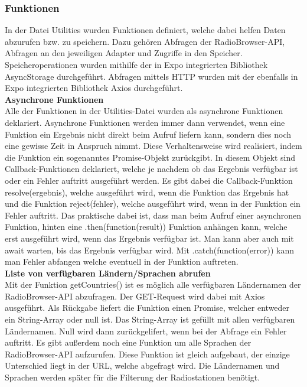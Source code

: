\documentclass[11pt, twoside]{article}
\begin{document}
\subsubsection{Funktionen}
In der Datei Utilities wurden Funktionen definiert, welche dabei helfen Daten abzurufen bzw. zu speichern. Dazu gehören Abfragen der RadioBrowser-API, Abfragen an den jeweiligen Adapter und Zugriffe in den Speicher. Speicheroperationen wurden mithilfe der in Expo integrierten Bibliothek \glqq AsyncStorage \grqq{}  durchgeführt. Abfragen mittels HTTP wurden mit der ebenfalls in Expo integrierten Bibliothek \glqq Axios \grqq{} durchgeführt. \newline \\
\textbf{Asynchrone Funktionen} \\
Alle der Funktionen in der Utilities-Datei wurden als asynchrone Funktionen deklariert. Asynchrone Funktionen werden immer dann verwendet, wenn eine Funktion ein Ergebnis nicht direkt beim Aufruf liefern kann, sondern dies noch eine gewisse Zeit in Anspruch nimmt. Diese Verhaltensweise wird realisiert, indem die Funktion ein sogenanntes Promise-Objekt zurückgibt. In diesem Objekt sind Callback-Funktionen deklariert, welche je nachdem ob das Ergebnis verfügbar ist oder ein Fehler auftritt ausgeführt werden. Es gibt dabei die Callback-Funktion resolve(ergebnis), welche ausgeführt wird, wenn die Funktion das Ergebnis hat und die Funktion reject(fehler), welche ausgeführt wird, wenn in der Funktion ein Fehler auftritt. Das praktische dabei ist, dass man beim Aufruf einer asynchronen Funktion, hinten eine .then(function(result)) Funktion anhängen kann, welche erst ausgeführt wird, wenn das Ergebnis verfügbar ist. Man kann aber auch mit await warten, bis das Ergebnis verfügbar wird. Mit .catch(function(error)) kann man Fehler abfangen welche eventuell in der Funktion auftreten. \newline \\
\textbf{Liste von verfügbaren Ländern/Sprachen abrufen} \\
Mit der Funktion getCountries() ist es möglich alle verfügbaren Ländernamen der RadioBrowser-API abzufragen. Der GET-Request wird dabei mit Axios ausgeführt. Als Rückgabe liefert die Funktion einen Promise, welcher entweder ein String-Array oder null ist. Das String-Array ist gefüllt mit allen verfügbaren Ländernamen. Null wird dann zurückgelifert, wenn bei der Abfrage ein Fehler auftritt. Es gibt außerdem noch eine Funktion um alle Sprachen der RadioBrowser-API aufzurufen. Diese Funktion ist gleich aufgebaut, der einzige Unterschied liegt in der URL, welche abgefragt wird. Die Ländernamen und Sprachen werden später für die Filterung der Radiostationen benötigt. \newline \\
\end{document}
